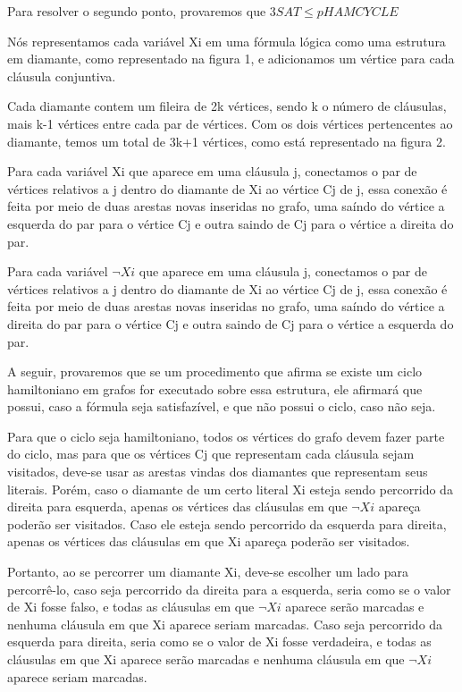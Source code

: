 \documentclass[12pt]{article}
\begin{document}
\begin{enumerate}
{    Para resolver o segundo ponto, provaremos que  \(3SAT \leq p HAMCYCLE\)
    
    Nós representamos cada variável Xi em uma fórmula lógica como uma estrutura em diamante, como representado na figura 1, e adicionamos um vértice para cada cláusula conjuntiva.
    
    Cada diamante contem um fileira de 2k vértices, sendo k o número de cláusulas, mais k-1 vértices entre cada par de vértices. Com os dois vértices pertencentes ao diamante, temos um total de 3k+1 vértices, como está representado na figura 2.
    
    Para cada variável Xi que aparece em uma cláusula j, conectamos o par de vértices relativos a j dentro do diamante de Xi ao vértice Cj de j, essa conexão é feita por meio de duas arestas novas inseridas no grafo, uma saíndo do vértice a esquerda do par para o vértice Cj e outra saindo de Cj para o vértice a direita do par.
    
    Para cada variável \(\neg Xi\) que aparece em uma cláusula j, conectamos o par de vértices relativos a j dentro do diamante de Xi ao vértice Cj de j, essa conexão é feita por meio de duas arestas novas inseridas no grafo, uma saíndo do vértice a direita do par para o vértice Cj e outra saindo de Cj para o vértice a esquerda do par.
    
    A seguir, provaremos que se um procedimento que afirma se existe um ciclo hamiltoniano em grafos for executado sobre essa estrutura, ele afirmará que possui, caso a fórmula seja satisfazível, e que não possui o ciclo, caso não seja.
    
    Para que o ciclo seja hamiltoniano, todos os vértices do grafo devem fazer parte do ciclo, mas para que os vértices Cj que representam cada cláusula sejam visitados, deve-se usar as arestas vindas dos diamantes que representam seus literais. Porém, caso o diamante de um certo literal Xi esteja sendo percorrido da direita para esquerda, apenas os vértices das cláusulas em que \(\neg Xi\) apareça poderão ser visitados. Caso ele esteja sendo percorrido da esquerda para direita, apenas os vértices das cláusulas em que Xi apareça poderão ser visitados.
    
    Portanto, ao se percorrer um diamante Xi, deve-se escolher um lado para percorrê-lo, caso seja percorrido da direita para a esquerda, seria como se o valor de Xi fosse falso, e todas as cláusulas em que \(\neg Xi\) aparece serão marcadas e nenhuma cláusula em que Xi aparece seriam marcadas. Caso seja percorrido da esquerda para direita, seria como se o valor de Xi fosse verdadeira, e todas as cláusulas em que Xi aparece serão marcadas e nenhuma cláusula em que \(\neg Xi\) aparece seriam marcadas.
    
}
\end{enumerate}
\end{document}
